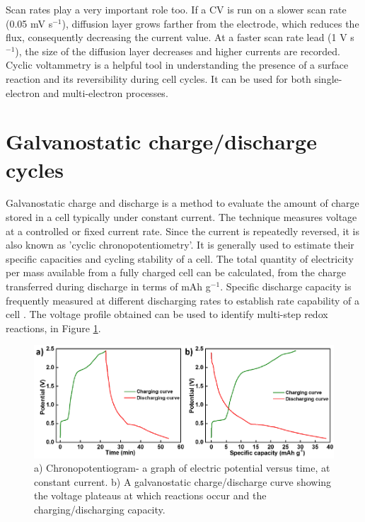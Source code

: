Scan rates play a very important role too. If a CV is run on a slower scan rate (0.05 mV s$^{-1}$), diffusion layer grows farther from the electrode, which reduces the flux, consequently decreasing the current value. At a faster scan rate lead (1 V s$^{-1}$), the size of the diffusion layer decreases and higher currents are recorded. Cyclic voltammetry is a helpful tool in understanding the presence of a surface reaction and its reversibility during cell cycles. It can be used for both single-electron and multi-electron processes.  

\section{Galvanostatic charge/discharge cycles}
Galvanostatic  charge and discharge is a method to evaluate the amount of charge stored in a cell typically under constant current. The technique measures voltage at a controlled or fixed current rate. Since the current is repeatedly reversed, it is also known as 'cyclic chronopotentiometry'. It is generally used to estimate their specific capacities and cycling stability of a cell. The total quantity of electricity per mass available from a fully charged cell can be calculated, from the charge transferred during discharge in terms of mAh g$^{-1}$. Specific discharge capacity is frequently measured at different discharging rates to establish rate capability of a cell \cite{pyun_electrochemistry_2012-1}. The voltage profile obtained can be used to identify multi-step redox reactions, in Figure \ref{Figures/chap2fig:ChrononCDC}. 

\begin{figure}[tbh!]
\centering
\includegraphics[width=\textwidth]{Figures/chap2fig/ChrononCDC}
\caption{a) Chronopotentiogram- a graph of electric potential versus time, at constant current. b) A galvanostatic charge/discharge curve showing the voltage plateaus at which reactions occur and the charging/discharging capacity.}
\label{Figures/chap2fig:ChrononCDC}
\end{figure}
